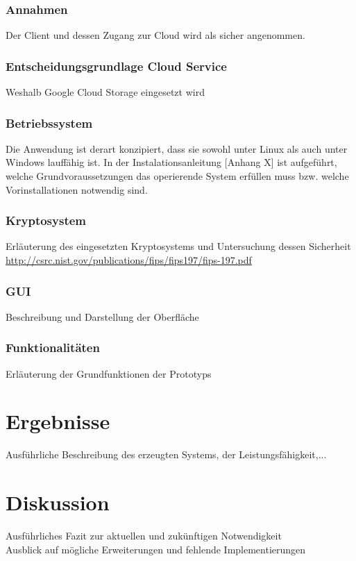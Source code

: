 \documentclass[12pt,a4paper,bibliography=totocnumbered,listof=totocnumbered]{scrartcl}
\begin{document}
\subsubsection{Annahmen}
Der Client und dessen Zugang zur Cloud wird als sicher angenommen.
\subsubsection{Entscheidungsgrundlage Cloud Service}
Weshalb Google Cloud Storage eingesetzt wird
\subsubsection{Betriebssystem}
Die Anwendung ist derart konzipiert, dass sie sowohl unter Linux als auch unter Windows lauffähig ist. In der Instalationsanleitung [Anhang X] ist aufgeführt, welche Grundvoraussetzungen das operierende System erfüllen muss bzw. welche Vorinstallationen notwendig sind.

 
\subsubsection{Kryptosystem}
Erläuterung des eingesetzten Kryptosystems und Untersuchung dessen Sicherheit\\
\url{http://csrc.nist.gov/publications/fips/fips197/fips-197.pdf}
\subsubsection{GUI}
Beschreibung und Darstellung der Oberfläche
\subsubsection{Funktionalitäten}
Erläuterung der Grundfunktionen der Prototyps

\pagebreak

\section{Ergebnisse}
Ausführliche Beschreibung des erzeugten Systems, der Leistungsfähigkeit,...

\pagebreak

\section{Diskussion}
Ausführliches Fazit zur aktuellen und zukünftigen Notwendigkeit\\
Ausblick auf mögliche Erweiterungen und fehlende Implementierungen
\end{document}
